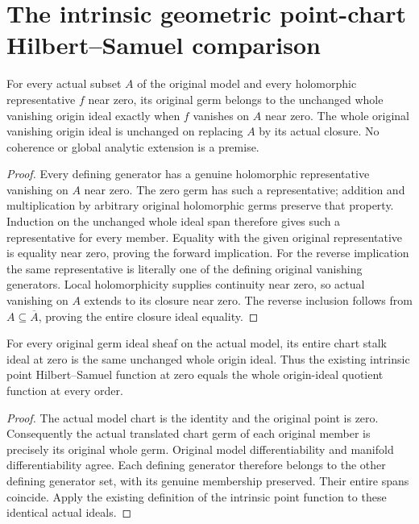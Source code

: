 \section{The intrinsic geometric point-chart Hilbert--Samuel comparison}

\begin{theorem}
\label{hir:actual-whole-vanishing-origin-ideal-meaning}
\leanok
For every actual subset $A$ of the original model and every holomorphic
representative $f$ near zero, its original germ belongs to the unchanged
whole vanishing origin ideal exactly when $f$ vanishes on $A$ near zero.
The whole original vanishing origin ideal is unchanged on replacing $A$
by its actual closure. No coherence or global analytic extension is a premise.
\end{theorem}
\begin{proof}
Every defining generator has a genuine holomorphic representative
vanishing on $A$ near zero. The zero germ has such a representative;
addition and multiplication by arbitrary original holomorphic germs
preserve that property. Induction on the unchanged whole ideal span
therefore gives such a representative for every member. Equality with
the given original representative is equality near zero, proving the
forward implication. For the reverse implication the same representative
is literally one of the defining original vanishing generators.
Local holomorphicity supplies continuity near zero, so actual vanishing
on $A$ extends to its closure near zero. The reverse inclusion follows
from $A\subseteq\overline A$, proving the entire closure ideal equality.
\end{proof}

\begin{theorem}
\label{hir:actual-model-zero-whole-stalk-hs-dictionary}
\leanok
For every original germ ideal sheaf on the actual model, its entire chart
stalk ideal at zero is the same unchanged whole origin ideal. Thus the
existing intrinsic point Hilbert--Samuel function at zero equals the
whole origin-ideal quotient function at every order.
\end{theorem}
\begin{proof}
The actual model chart is the identity and the original point is zero.
Consequently the actual translated chart germ of each original member
is precisely its original whole germ. Original model differentiability
and manifold differentiability agree. Each defining generator therefore
belongs to the other defining generator set, with its genuine membership
preserved. Their entire spans coincide. Apply the existing definition
of the intrinsic point function to these identical actual ideals.
\end{proof}

